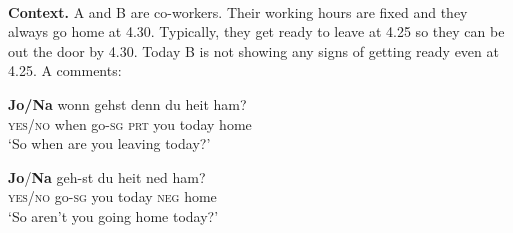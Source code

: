 \documentclass[output=paper]{LSP/langsci}
\begin{document}
\ea\label{ex:wiltschko:69}
\\
\textbf{Context.} A and B are co-workers. Their working hours are fixed and they always go home at 4.30. Typically, they get ready to leave at 4.25 so they can be out the door by 4.30. Today B is not showing any signs of getting ready even at 4.25. A comments:
\begin{xlista}
\ex
\gll  \textbf{{Jo/Na}} wonn  gehst   denn   du   heit   ham?\\
    \textsc{yes/no} when go-\textsc{sg}  \textsc{prt} you   today   home\\
  \glt ‘So when are you leaving today?’

\ex
 \textbf{Jo}/\textbf{Na} geh-st   du     heit    ned    ham?\\
    \textsc{yes/no} go-\textsc{sg}  you  today  \textsc{neg} home\\
    \glt ‘So aren’t you going home today?’
\end{xlista}
\z
\end{document}
